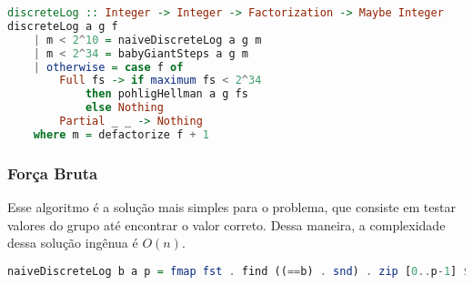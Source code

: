 \documentclass{article}
\begin{document}
\noindent\hspace{0.03\linewidth}
\begin{minipage}{.9\linewidth}
\begin{lstlisting}[language=haskell,caption=Logarítmo Discreto]
discreteLog :: Integer -> Integer -> Factorization -> Maybe Integer
discreteLog a g f
    | m < 2^10 = naiveDiscreteLog a g m
    | m < 2^34 = babyGiantSteps a g m
    | otherwise = case f of
        Full fs -> if maximum fs < 2^34
            then pohligHellman a g fs
            else Nothing
        Partial _ _ -> Nothing
    where m = defactorize f + 1
\end{lstlisting}
\end{minipage}

\subsubsection{Força Bruta}
Esse algoritmo é a solução mais simples para o problema, que consiste em testar valores do grupo até encontrar o valor correto.
Dessa maneira, a complexidade dessa solução ingênua é $O(n)$.

\noindent\hspace{0.03\linewidth}
\begin{minipage}{.9\linewidth}
\begin{lstlisting}[language=haskell,caption=Logarítmo Discreto Ingênuo]
naiveDiscreteLog b a p = fmap fst . find ((==b) . snd) . zip [0..p-1] $ iterate ((`mod`p) . (*a)) 1
\end{lstlisting}
\end{minipage}
\end{document}

